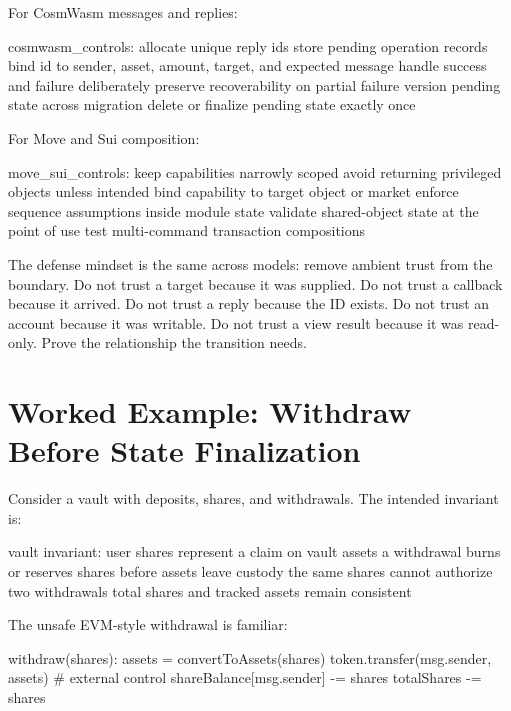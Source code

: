 For CosmWasm messages and replies:

\begin{codeblock}
cosmwasm_controls:
    allocate unique reply ids
    store pending operation records
    bind id to sender, asset, amount, target, and expected message
    handle success and failure deliberately
    preserve recoverability on partial failure
    version pending state across migration
    delete or finalize pending state exactly once
\end{codeblock}

For Move and Sui composition:

\begin{codeblock}
move_sui_controls:
    keep capabilities narrowly scoped
    avoid returning privileged objects unless intended
    bind capability to target object or market
    enforce sequence assumptions inside module state
    validate shared-object state at the point of use
    test multi-command transaction compositions
\end{codeblock}

The defense mindset is the same across models: remove ambient trust from the boundary. Do not trust a target because it was supplied. Do not trust a callback because it arrived. Do not trust a reply because the ID exists. Do not trust an account because it was writable. Do not trust a view result because it was read-only. Prove the relationship the transition needs.

\section{Worked Example: Withdraw Before State Finalization}

Consider a vault with deposits, shares, and withdrawals. The intended invariant is:

\begin{codeblock}
vault invariant:
    user shares represent a claim on vault assets
    a withdrawal burns or reserves shares before assets leave custody
    the same shares cannot authorize two withdrawals
    total shares and tracked assets remain consistent
\end{codeblock}

The unsafe EVM-style withdrawal is familiar:

\begin{codeblock}
withdraw(shares):
    assets = convertToAssets(shares)
    token.transfer(msg.sender, assets)      # external control
    shareBalance[msg.sender] -= shares
    totalShares -= shares
\end{codeblock}

